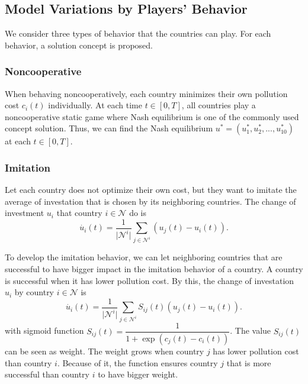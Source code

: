 \documentclass[a4paper,fleqn]{cas-dc}
\begin{document}
\subsection{Model Variations by Players' Behavior} \label{subsection:model variation}

We consider three types of behavior that the countries can play. For each behavior, a solution concept is proposed.

\subsubsection{Noncooperative}

When behaving noncooperatively, each country minimizes their own pollution cost $c_i(t)$ individually. At each time $t\in [0,T]$, all countries play a noncooperative static game where Nash equilibrium is one of the commonly used concept solution. Thus, we can find the Nash equilibrium $u^*=(u_1^*,u_2^*,...,u_{10}^*)$ at each $t\in [0,T]$.

\subsubsection{Imitation}

Let each country does not optimize their own cost, but they want to imitate the average of investation that is chosen by its neighboring countries. The change of investment $u_i$ that country $i\in \mathcal{N}$ do is
\begin{equation}
    \dot{u_i}(t) = \dfrac{1}{\lvert \mathcal{N}^i \rvert} \sum_{j\in \mathcal{N}^i}{\left(u_j(t) - u_i(t)\right)}.
\end{equation}

To develop the imitation behavior, we can let neighboring countries that are successful to have bigger impact in the imitation behavior of a country. A country is successful when it has lower pollution cost. By this, the change of investation $u_i$ by country $i\in \mathcal{N}$ is
\begin{equation}
    \dot{u_i}(t) = \dfrac{1}{\lvert \mathcal{N}^i \rvert} \sum_{j\in \mathcal{N}^i}{S_{ij}(t)\left(u_j(t) - u_i(t)\right)}.
\end{equation}
with sigmoid function $S_{ij}(t)=\dfrac{1}{1+\exp{\left(c_j(t)-c_i(t)\right)}}$.
The value $S_{ij}(t)$ can be seen as weight. The weight grows when country $j$ has lower pollution cost than country $i$. Because of it, the function ensures country $j$ that is more successful than country $i$ to have bigger weight.
\end{document}
